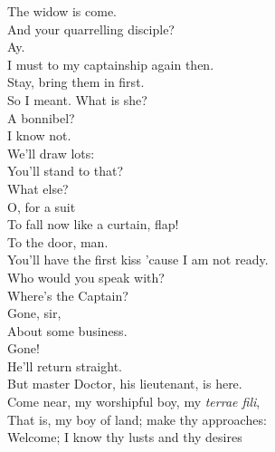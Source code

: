 \documentclass[a4paper,oneside,12pt]{memoir}
\begin{document}
\begin{drama*}
\scene

\subtlespeaks The widow is come.\\
\facespeaks {} And your quarrelling disciple?\\
\subtlespeaks Ay.\\
\facespeaks {} I must to my captainship again then.\\
\subtlespeaks Stay, bring them in first.\\
\facespeaks {} So I meant. What is she?\\
A bonnibel?\\
\subtlespeaks {} I know not.\\
\facespeaks {} We'll draw lots:\\
You'll stand to that?\\
\subtlespeaks {} What else?\\
\facespeaks {} O, for a suit\\
To fall now like a curtain, flap!\\
\subtlespeaks {} To the door, man.\\
\facespeaks You'll have the first kiss 'cause I am not ready.\\
Who would you speak with?\\
\kastrilspeaks {} Where's the Captain?\\
\facespeaks {} Gone, sir,\\
About some business.\\
\kastrilspeaks {} Gone!\\
\facespeaks {} He'll return straight.\\
But master Doctor, his lieutenant, is here.\\
\subtlespeaks Come near, my worshipful boy, my \emph{terrae fili},\\
That is, my boy of land; make thy approaches:\\
Welcome; I know thy lusts and thy desires\\

\end{drama*}
\end{document}
